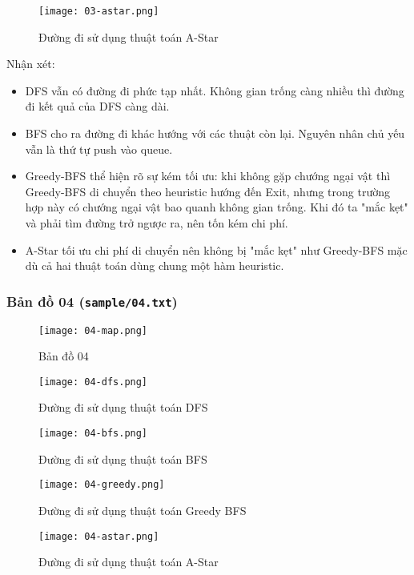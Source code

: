 \documentclass{article}
\begin{document}
\begin{figure}[H]
	\centering
	\texttt{[image: 03-astar.png]}
	\caption{Đường đi sử dụng thuật toán A-Star}
\end{figure}

Nhận xét:
\begin{itemize}
\item DFS vẫn có đường đi phức tạp nhất. Không gian trống càng nhiều thì đường đi kết quả của DFS càng dài.
\item BFS cho ra đường đi khác hướng với các thuật còn lại. Nguyên nhân chủ yếu vẫn là thứ tự push vào queue.
\item Greedy-BFS thể hiện rõ sự kém tối ưu: khi không gặp chướng ngại vật thì Greedy-BFS di chuyển theo heuristic hướng đến Exit, nhưng trong trường hợp này có chướng ngại vật bao quanh không gian trống. Khi đó ta "mắc kẹt" và phải tìm đường trở ngược ra, nên tốn kém chi phí.
\item A-Star tối ưu chi phí di chuyển nên không bị "mắc kẹt" như Greedy-BFS mặc dù cả hai thuật toán dùng chung một hàm heuristic.
\end{itemize}

\subsubsection{Bản đồ 04 (\texttt{sample/04.txt})}
\begin{figure}[H]
	\centering
	\texttt{[image: 04-map.png]}
	\caption{Bản đồ 04}
\end{figure}

\begin{figure}[H]
	\centering
	\texttt{[image: 04-dfs.png]}
	\caption{Đường đi sử dụng thuật toán DFS}
\end{figure}

\begin{figure}[H]
	\centering
	\texttt{[image: 04-bfs.png]}
	\caption{Đường đi sử dụng thuật toán BFS}
\end{figure}

\begin{figure}[H]
	\centering
	\texttt{[image: 04-greedy.png]}
	\caption{Đường đi sử dụng thuật toán Greedy BFS}
\end{figure}

\begin{figure}[H]
	\centering
	\texttt{[image: 04-astar.png]}
	\caption{Đường đi sử dụng thuật toán A-Star}
\end{figure}
\end{document}

